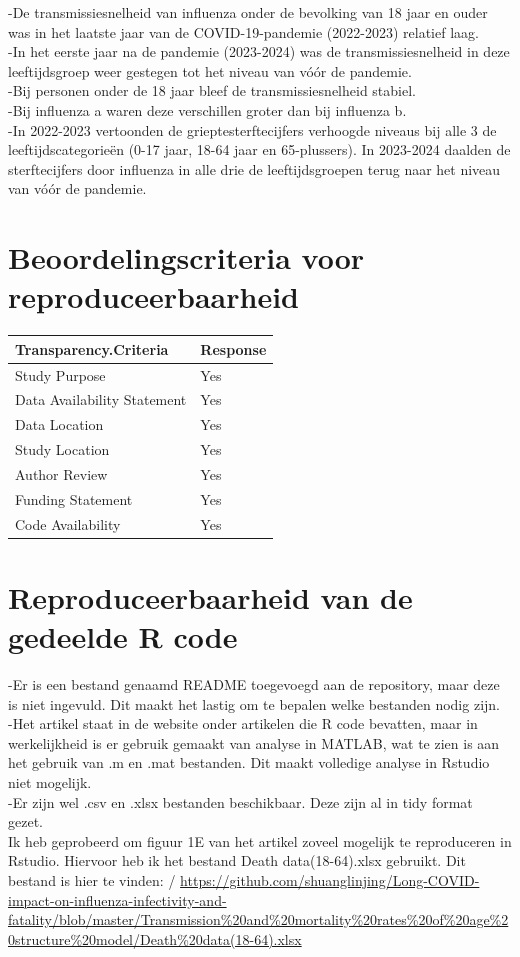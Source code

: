 \documentclass[
]{book}
\begin{document}
-De transmissiesnelheid van influenza onder de bevolking van 18 jaar en ouder was in het laatste jaar van de COVID-19-pandemie (2022-2023) relatief laag.\\
-In het eerste jaar na de pandemie (2023-2024) was de transmissiesnelheid in deze leeftijdsgroep weer gestegen tot het niveau van vóór de pandemie.\\
-Bij personen onder de 18 jaar bleef de transmissiesnelheid stabiel.\\
-Bij influenza a waren deze verschillen groter dan bij influenza b.\\
-In 2022-2023 vertoonden de grieptesterftecijfers verhoogde niveaus bij alle 3 de leeftijdscategorieën (0-17 jaar, 18-64 jaar en 65-plussers). In 2023-2024 daalden de sterftecijfers door influenza in alle drie de leeftijdsgroepen terug naar het niveau van vóór de pandemie.

\section{Beoordelingscriteria voor reproduceerbaarheid}\label{beoordelingscriteria-voor-reproduceerbaarheid}

\begin{tabular}{l|l}
\hline
Transparency.Criteria & Response\\
\hline
Study Purpose & Yes\\
\hline
Data Availability Statement & Yes\\
\hline
Data Location & Yes\\
\hline
Study Location & Yes\\
\hline
Author Review & Yes\\
\hline
Funding Statement & Yes\\
\hline
Code Availability & Yes\\
\hline
\end{tabular}

\section{Reproduceerbaarheid van de gedeelde R code}\label{reproduceerbaarheid-van-de-gedeelde-r-code}

-Er is een bestand genaamd README toegevoegd aan de repository, maar deze is niet ingevuld. Dit maakt het lastig om te bepalen welke bestanden nodig zijn.\\
-Het artikel staat in de website onder artikelen die R code bevatten, maar in werkelijkheid is er gebruik gemaakt van analyse in MATLAB, wat te zien is aan het gebruik van .m en .mat bestanden. Dit maakt volledige analyse in Rstudio niet mogelijk.\\
-Er zijn wel .csv en .xlsx bestanden beschikbaar. Deze zijn al in tidy format gezet.\\
Ik heb geprobeerd om figuur 1E van het artikel zoveel mogelijk te reproduceren in Rstudio. Hiervoor heb ik het bestand Death data(18-64).xlsx gebruikt. Dit bestand is hier te vinden: /
\url{https://github.com/shuanglinjing/Long-COVID-impact-on-influenza-infectivity-and-fatality/blob/master/Transmission\%20and\%20mortality\%20rates\%20of\%20age\%20structure\%20model/Death\%20data(18-64).xlsx}
\end{document}
